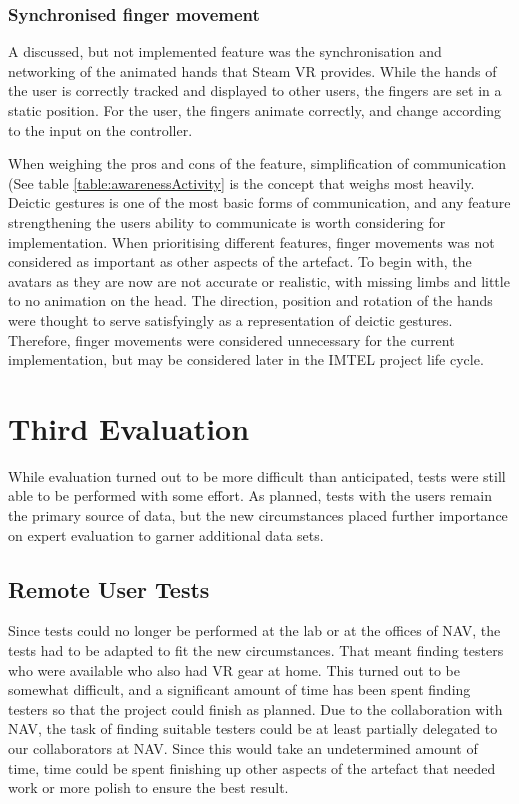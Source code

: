 \subsubsection{Synchronised finger movement}
A discussed, but not implemented feature was the synchronisation and networking of the animated hands that Steam VR provides. While the hands of the user is correctly tracked and displayed to other users, the fingers are set in a static position. For the user, the fingers animate correctly, and change according to the input on the controller.

When weighing the pros and cons of the feature, simplification of communication (See table \ref{table:awarenessActivity} is the concept that weighs most heavily. Deictic gestures is one of the most basic forms of communication, and any feature strengthening the users ability to communicate is worth considering for implementation. When prioritising different features, finger movements was not considered as important as other aspects of the artefact. To begin with, the avatars as they are now are not accurate or realistic, with missing limbs and little to no animation on the head. The direction, position and rotation of the hands were thought to serve satisfyingly as a representation of deictic gestures. Therefore, finger movements were considered unnecessary for the current implementation, but may be considered later in the IMTEL project life cycle.



\section{Third Evaluation}
\label{section:evalPhase3}
While evaluation turned out to be more difficult than anticipated, tests were still able to be performed with some effort. As planned, tests with the  users remain the primary source of data, but the new circumstances placed further importance on expert evaluation to garner additional data sets.

\subsection{Remote User Tests}
Since tests could no longer be performed at the lab or at the offices of NAV, the tests had to be adapted to fit the new circumstances. That meant finding testers who were available who also had VR gear at home. This turned out to be somewhat difficult, and a significant amount of time has been spent finding testers so that the project could finish as planned. Due to the collaboration with NAV, the task of finding suitable testers could be at least partially delegated to our collaborators at NAV. Since this would take an undetermined amount of time, time could be spent finishing up other aspects of the artefact that needed work or more polish to ensure the best result.

